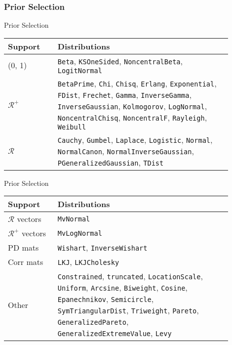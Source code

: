 \subsubsection{Prior Selection}
\begin{frame}{Prior Selection}
	\begin{center}
	\begin{tabular}{||p{0.2\linewidth} p{0.7\linewidth}||} 
	 \hline
	 Support & Distributions \\ [0.5ex] 
	 \hline\hline
	 (0, 1) & \lstinline{Beta}, \lstinline{KSOneSided}, \lstinline{NoncentralBeta}, \lstinline{LogitNormal} \\ 
	 \hline
	 $\mathcal{R}^+$ & \lstinline{BetaPrime}, \lstinline{Chi}, \lstinline{Chisq}, \lstinline{Erlang}, \lstinline{Exponential}, \lstinline{FDist}, \lstinline{Frechet}, \lstinline{Gamma}, \lstinline{InverseGamma}, \lstinline{InverseGaussian}, \lstinline{Kolmogorov}, \lstinline{LogNormal}, \lstinline{NoncentralChisq}, \lstinline{NoncentralF}, \lstinline{Rayleigh}, \lstinline{Weibull} \\
	 \hline
	 $\mathcal{R}$ & \lstinline{Cauchy}, \lstinline{Gumbel}, \lstinline{Laplace}, \lstinline{Logistic}, \lstinline{Normal}, \lstinline{NormalCanon}, \lstinline{NormalInverseGaussian}, \lstinline{PGeneralizedGaussian}, \lstinline{TDist} \\  [1ex] 
	 \hline
	\end{tabular}
	\end{center}
\end{frame}

\begin{frame}{Prior Selection}
	\begin{center}
	\begin{tabular}{||p{0.2\linewidth} p{0.7\linewidth}||} 
	 \hline
	 Support & Distributions \\ [0.5ex] 
	 \hline\hline
	 $\mathcal{R}$ vectors & \lstinline{MvNormal} \\
	 \hline
	 $\mathcal{R}^+$ vectors & \lstinline{MvLogNormal} \\
	 \hline
	 PD mats & \lstinline{Wishart}, \lstinline{InverseWishart} \\
	 \hline
	 Corr mats & \lstinline{LKJ}, \lstinline{LKJCholesky} \\
	 \hline
	 Other & \lstinline{Constrained}, \lstinline{truncated}, \lstinline{LocationScale}, \lstinline{Uniform}, \lstinline{Arcsine}, \lstinline{Biweight}, \lstinline{Cosine}, \lstinline{Epanechnikov}, \lstinline{Semicircle}, \lstinline{SymTriangularDist}, \lstinline{Triweight}, \lstinline{Pareto}, \lstinline{GeneralizedPareto}, \lstinline{GeneralizedExtremeValue}, \lstinline{Levy} \\ [1ex] 
	 \hline
	\end{tabular}
	\end{center}
\end{frame}

